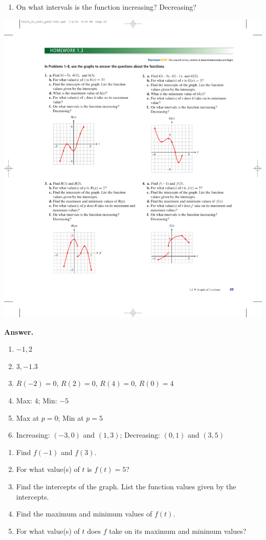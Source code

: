 \documentclass[10pt,]{book}
\theoremstyle{plain}
\theoremstyle{definition}
\theoremstyle{definition}
\theoremstyle{definition}
\theoremstyle{definition}
\numberwithin{equation}{part}
\begin{document}
\begin{exercisegroup}
\begin{enumerate}[label=*\alph**]
\item\hypertarget{li-674}{}On what intervals is the function increasing? Decreasing?%
\end{enumerate}
 \includegraphics[width=0.5\linewidth]{images/fig-ex-1-3-3}
%
\par\smallskip
\noindent\textbf{Answer.}\hypertarget{answer-94}{}\quad
\leavevmode%
\begin{enumerate}[label=*\alph**]
\item\hypertarget{li-675}{}\(-1, 2\)%
\item\hypertarget{li-676}{}\(3, -1.3\)%
\item\hypertarget{li-677}{}\(R(-2) = 0\), \(R(2) = 0\), \(R(4) = 0\), \(R(0) = 4\)%
\item\hypertarget{li-678}{}Max: \(4\); Min: \(-5\)%
\item\hypertarget{li-679}{}Max at \(p = 0\); Min at \(p = 5\)%
\item\hypertarget{li-680}{}Increasing: \((-3, 0)\) and \((1, 3)\); Decreasing: \((0, 1)\) and \((3, 5)\)%
\end{enumerate}
%
\exercise[4.]\hypertarget{exercise-161}{}\leavevmode%
\begin{enumerate}[label=*\alph**]
\item\hypertarget{li-681}{}Find \(f (-1)\) and \(f (3)\).%
\item\hypertarget{li-682}{}For what value(s) of \(t\) is \(f(t)=5\)?%
\item\hypertarget{li-683}{}Find the intercepts of the graph. List the function values given by the intercepts.%
\item\hypertarget{li-684}{}Find the maximum and minimum values of \(f(t)\).%
\item\hypertarget{li-685}{}For what value(s) of \(t\) does \(f\) take on its maximum and minimum values?%

\end{enumerate}
\end{exercisegroup}
\end{document}

